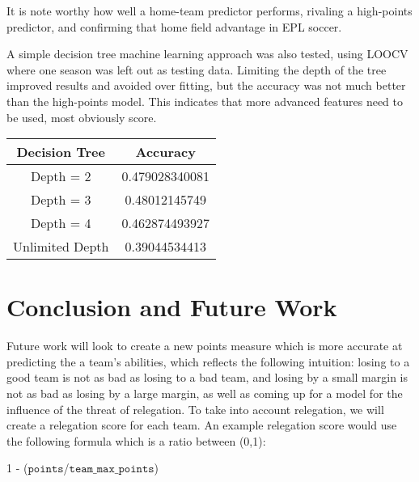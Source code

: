 \documentclass[conference]{IEEEtran}
\begin{document}
It is note worthy how well a home-team predictor performs, rivaling a high-points predictor, and confirming that home field advantage in EPL soccer.

A simple decision tree machine learning approach was also tested, using LOOCV where one season was left out as testing data. Limiting the depth of the tree improved results and avoided over fitting, but the accuracy was not much better than the high-points model.  This indicates that more advanced features need to be used, most obviously score.

\begin{center}
  \begin{tabular}{@{} cc @{}}
    \hline
    Decision Tree & Accuracy \\ 
    \hline
Depth = 2 &0.479028340081\\ 
    Depth = 3 & 0.48012145749\\ 
   Depth = 4 & 0.462874493927 \\ 
    Unlimited Depth & 0.39044534413\\ 
    \hline
  \end{tabular}
\end{center}

\section{Conclusion and Future Work}
Future work will look to create a new points measure which is more accurate at predicting the a team's abilities, which reflects the following intuition: losing to a good team is not as bad as losing to a bad team, and losing by a small margin is not as bad as losing by a large margin, as well as coming up for a model for the influence of the threat of relegation. 
To take into account relegation, we will create a relegation score for each team. An example relegation score would use the following formula which is a ratio between (0,1): 

\begin{center}
	1 - ($\mathtt{points}$/$\mathtt{team\_max\_points}$)
\end{center}
\end{document}

